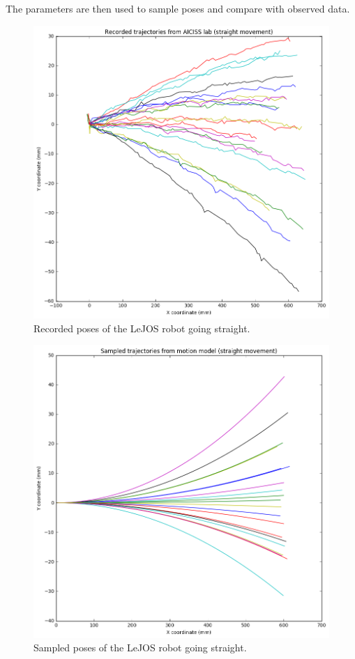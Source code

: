 \documentclass[paper=a4, fontsize=11pt]{scrartcl} %
\begin{document}
    The parameters are then used to sample poses and compare with observed data.

    \newpage
    \begin{figure}[H]
        \begin{center}
            \setlength{\fboxsep}{0.5pt} %
            \setlength{\fboxrule}{0.5pt}
            \includegraphics[width=0.65\linewidth,fbox]{images/recorded_poses_straight.png}
            \caption{Recorded poses of the LeJOS robot going straight.}
        \end{center}
    \end{figure}

    \begin{figure}[H]
        \begin{center}
            \setlength{\fboxsep}{0.5pt} %
            \setlength{\fboxrule}{0.5pt}
            \includegraphics[width=0.65\linewidth,fbox]{images/sampled_poses_straight.png}
            \caption{Sampled poses of the LeJOS robot going straight.}
        \end{center}
    \end{figure}
    
\end{document}
